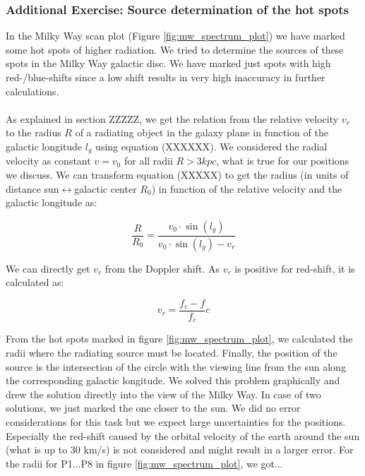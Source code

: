 \subsubsection{Additional Exercise: Source determination of the hot spots}\label{sec:HotSpots}
In the Milky Way scan plot (Figure \ref{fig:mw_spectrum_plot}) we have marked some hot spots of higher radiation. We tried to determine the sources of these spots in the Milky Way galactic disc. We have marked just spots with high red-/blue-shifts since a low shift results in very high inaccuracy in further calculations. \\
 \\
As explained in section ZZZZZ, we get the relation from the relative velocity $v_r$ to the radius $R$ of a radiating object in the galaxy plane in function of the galactic longitude $l_g$ using equation (XXXXXX). We considered the radial velocity as constant $v = v_0$ for all radii $R > 3kpc$, what is true for our positions we discuss. We can transform equation (XXXXX) to get the radius (in units of distance sun$\leftrightarrow$galactic center $R_0$) in function of the relative velocity and the galactic longitude as:

\begin{equation}
	\frac{R}{R_0}=\frac{v_0\cdot \sin(l_g)}{v_0\cdot \sin(l_g)-v_r}
\end{equation}

We can directly get $v_r$ from the Doppler shift. As $v_r$ is positive for red-shift, it is calculated as:

\begin{equation}
	v_r = \frac{f_c-f}{f_c} c
\end{equation}

From the hot spots marked in figure \ref{fig:mw_spectrum_plot}, we calculated the radii where the radiating source must be located. Finally, the position of the source is the intersection of the circle with the viewing line from the sun along the corresponding galactic longitude. We solved this problem graphically and drew the solution directly into the view of the Milky Way. In case of two solutions, we just marked the one closer to the sun. We did no error considerations for this task but we expect large uncertainties for the positions. Especially the red-shift caused by the orbital velocity of the earth around the sun (what is up to 30 km/s) is not considered and might result in a larger error. For the radii for P1...P8 in figure \ref{fig:mw_spectrum_plot}, we got...

